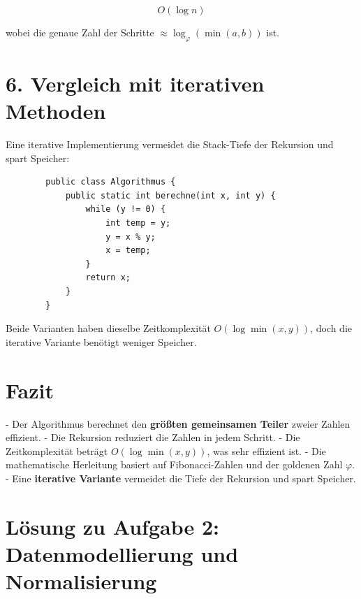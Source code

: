 \documentclass[a4paper,12pt]{article}
\begin{document}
	\[
	\boxed{O(\log n)}
	\]
	
	wobei die genaue Zahl der Schritte \( \approx \log_\varphi(\min(a, b)) \) ist.
	
	
	
	\section*{6. Vergleich mit iterativen Methoden}
	
	Eine iterative Implementierung vermeidet die Stack-Tiefe der Rekursion und spart Speicher:
	
	\begin{verbatim}
		public class Algorithmus {
			public static int berechne(int x, int y) {
				while (y != 0) {
					int temp = y;
					y = x % y;
					x = temp;
				}
				return x;
			}
		}
	\end{verbatim}
	
	Beide Varianten haben dieselbe Zeitkomplexität \( O(\log \min(x, y)) \), doch die iterative Variante benötigt weniger Speicher.
	
	\section*{Fazit}
	
	- Der Algorithmus berechnet den \textbf{größten gemeinsamen Teiler} zweier Zahlen effizient.
	- Die Rekursion reduziert die Zahlen in jedem Schritt.
	- Die Zeitkomplexität beträgt \( O(\log \min(x, y)) \), was sehr effizient ist.
	- Die mathematische Herleitung basiert auf Fibonacci-Zahlen und der goldenen Zahl \( \varphi \).
	- Eine \textbf{iterative Variante} vermeidet die Tiefe der Rekursion und spart Speicher.
	
	
	\section*{Lösung zu Aufgabe 2: Datenmodellierung und Normalisierung}
	
\end{document}
